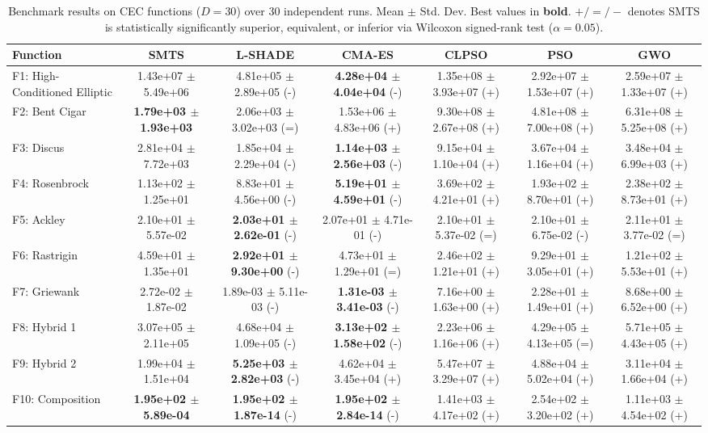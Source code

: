 \documentclass[journal]{IEEEtran}
\begin{document}
\begin{table}[t]
\centering
\caption{Benchmark results on CEC functions ($D = 30$) over 30 independent runs. Mean $\pm$ Std. Dev. Best values in \textbf{bold}. $+/=/-$ denotes SMTS is statistically significantly superior, equivalent, or inferior via Wilcoxon signed-rank test ($\alpha = 0.05$).}
\label{tab:results_D30}
\scriptsize
\begin{tabular}{lcccccc}
\hline
Function & \textbf{SMTS} & \textbf{L-SHADE} & \textbf{CMA-ES} & \textbf{CLPSO} & \textbf{PSO} & \textbf{GWO} \\
\hline
F1: High-Conditioned Elliptic & 1.43e+07 $\pm$ 5.49e+06 & 4.81e+05 $\pm$ 2.89e+05 (-) & \textbf{4.28e+04 $\pm$ 4.04e+04} (-) & 1.35e+08 $\pm$ 3.93e+07 (+) & 2.92e+07 $\pm$ 1.53e+07 (+) & 2.59e+07 $\pm$ 1.33e+07 (+) \\
F2: Bent Cigar & \textbf{1.79e+03 $\pm$ 1.93e+03} & 2.06e+03 $\pm$ 3.02e+03 (=) & 1.53e+06 $\pm$ 4.83e+06 (+) & 9.30e+08 $\pm$ 2.67e+08 (+) & 4.81e+08 $\pm$ 7.00e+08 (+) & 6.31e+08 $\pm$ 5.25e+08 (+) \\
F3: Discus & 2.81e+04 $\pm$ 7.72e+03 & 1.85e+04 $\pm$ 2.29e+04 (-) & \textbf{1.14e+03 $\pm$ 2.56e+03} (-) & 9.15e+04 $\pm$ 1.10e+04 (+) & 3.67e+04 $\pm$ 1.16e+04 (+) & 3.48e+04 $\pm$ 6.99e+03 (+) \\
F4: Rosenbrock & 1.13e+02 $\pm$ 1.25e+01 & 8.83e+01 $\pm$ 4.56e+00 (-) & \textbf{5.19e+01 $\pm$ 4.59e+01} (-) & 3.69e+02 $\pm$ 4.21e+01 (+) & 1.93e+02 $\pm$ 8.70e+01 (+) & 2.38e+02 $\pm$ 8.73e+01 (+) \\
F5: Ackley & 2.10e+01 $\pm$ 5.57e-02 & \textbf{2.03e+01 $\pm$ 2.62e-01} (-) & 2.07e+01 $\pm$ 4.71e-01 (-) & 2.10e+01 $\pm$ 5.37e-02 (=) & 2.10e+01 $\pm$ 6.75e-02 (-) & 2.11e+01 $\pm$ 3.77e-02 (=) \\
F6: Rastrigin & 4.59e+01 $\pm$ 1.35e+01 & \textbf{2.92e+01 $\pm$ 9.30e+00} (-) & 4.73e+01 $\pm$ 1.29e+01 (=) & 2.46e+02 $\pm$ 1.21e+01 (+) & 9.29e+01 $\pm$ 3.05e+01 (+) & 1.21e+02 $\pm$ 5.53e+01 (+) \\
F7: Griewank & 2.72e-02 $\pm$ 1.87e-02 & 1.89e-03 $\pm$ 5.11e-03 (-) & \textbf{1.31e-03 $\pm$ 3.41e-03} (-) & 7.16e+00 $\pm$ 1.63e+00 (+) & 2.28e+01 $\pm$ 1.49e+01 (+) & 8.68e+00 $\pm$ 6.52e+00 (+) \\
F8: Hybrid 1 & 3.07e+05 $\pm$ 2.11e+05 & 4.68e+04 $\pm$ 1.09e+05 (-) & \textbf{3.13e+02 $\pm$ 1.58e+02} (-) & 2.23e+06 $\pm$ 1.16e+06 (+) & 4.29e+05 $\pm$ 4.13e+05 (=) & 5.71e+05 $\pm$ 4.43e+05 (+) \\
F9: Hybrid 2 & 1.99e+04 $\pm$ 1.51e+04 & \textbf{5.25e+03 $\pm$ 2.82e+03} (-) & 4.62e+04 $\pm$ 3.45e+04 (+) & 5.47e+07 $\pm$ 3.29e+07 (+) & 4.88e+04 $\pm$ 5.02e+04 (+) & 3.11e+04 $\pm$ 1.66e+04 (+) \\
F10: Composition & \textbf{1.95e+02 $\pm$ 5.89e-04} & \textbf{1.95e+02 $\pm$ 1.87e-14} (-) & \textbf{1.95e+02 $\pm$ 2.84e-14} (-) & 1.41e+03 $\pm$ 4.17e+02 (+) & 2.54e+02 $\pm$ 3.20e+02 (+) & 1.11e+03 $\pm$ 4.54e+02 (+) \\
\hline
\end{tabular}
\end{table}
\end{document}
